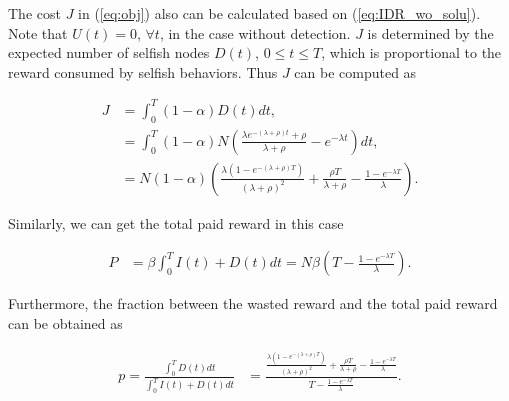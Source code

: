 The cost $J$ in (\ref{eq:obj}) also can be calculated based on (\ref{eq:IDR_wo_solu}).
Note that $U(t)=0$, $\forall t$,
in the case without detection.
$J$ is determined by the expected number of selfish nodes $D(t)$,
$0 \le t \le T$,
which is proportional to the reward consumed by selfish behaviors.
Thus $J$ can be computed as
\begin{small}
\begin{equation}
\label{eq:IDR_wo_J}
\begin{aligned}
J &= \int_{0}^{T} (1-\alpha) D(t) dt, \\
&= \int_{0}^{T} (1-\alpha) N (\frac{\lambda e^{-(\lambda + \rho)t} + \rho}{ \lambda + \rho } - e^{- \lambda t}) dt, \\
&= N (1-\alpha) \left( \frac{\lambda (1-e^{-(\lambda+\rho)T})}{ (\lambda + \rho)^{2} }
+ \frac{\rho T}{\lambda + \rho}
- \frac{1-e^{-\lambda T}}{\lambda} \right).
\end{aligned}
\end{equation}
\end{small}
Similarly, we can get the total paid reward in this case
\begin{small}
\begin{equation}
\nonumber
\begin{aligned}
P &= \beta \int_{0}^{T} I(t) + D(t) dt
= N \beta (T - \frac{ 1 - e^{-\lambda T} }{\lambda} ).
\end{aligned}
\end{equation}
\end{small}
Furthermore, the fraction between the wasted reward and the total paid reward can be obtained as
\begin{small}
\begin{equation}
\nonumber
\begin{aligned}
p = \frac{\int_{0}^{T} D(t) dt}{\int_{0}^{T} I(t) + D(t) dt}
&= \frac{ \frac{\lambda (1-e^{-(\lambda+\rho)T})}{ (\lambda + \rho)^{2} }
+ \frac{\rho T}{\lambda + \rho}
- \frac{1-e^{-\lambda T}}{\lambda} }
{T - \frac{ 1 - e^{-\lambda T} }{\lambda} }.
\end{aligned}
\end{equation}
\end{small}

